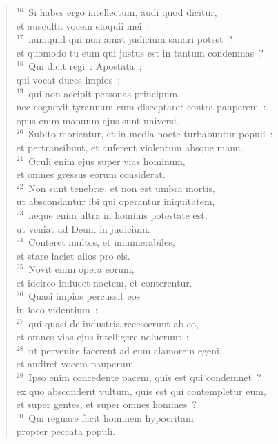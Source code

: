 \begin{flushleft}
\begin{verse}
${}^{16}$~Si habes ergo intellectum, audi quod dicitur,\\ et ausculta vocem eloquii mei~:\\
${}^{17}$~numquid qui non amat judicium sanari potest~?\\ et quomodo tu eum qui justus est in tantum condemnas~?\\
${}^{18}$~Qui dicit regi~: Apostata~;\\ qui vocat duces impios~;\\
${}^{19}$~qui non accipit personas principum,\\ nec cognovit tyrannum cum disceptaret contra pauperem~:\\ opus enim manuum ejus sunt universi.\\
${}^{20}$~Subito morientur, et in media nocte turbabuntur populi~:\\ et pertransibunt, et auferent violentum absque manu.\\
${}^{21}$~Oculi enim ejus super vias hominum,\\ et omnes gressus eorum considerat.\\
${}^{22}$~Non sunt tenebr\ae , et non est umbra mortis,\\ ut abscondantur ibi qui operantur iniquitatem,\\
${}^{23}$~neque enim ultra in hominis potestate est,\\ ut veniat ad Deum in judicium.\\
${}^{24}$~Conteret multos, et innumerabiles,\\ et stare faciet alios pro eis.\\
${}^{25}$~Novit enim opera eorum,\\ et idcirco inducet noctem, et conterentur.\\
${}^{26}$~Quasi impios percussit eos\\ in loco videntium~:\\
${}^{27}$~qui quasi de industria recesserunt ab eo,\\ et omnes vias ejus intelligere noluerunt~:\\
${}^{28}$~ut pervenire facerent ad eum clamorem egeni,\\ et audiret vocem pauperum.\\
${}^{29}$~Ipso enim concedente pacem, quis est qui condemnet~?\\ ex quo absconderit vultum, quis est qui contempletur eum,\\ et super gentes, et super omnes homines~?\\
${}^{30}$~Qui regnare facit hominem hypocritam\\ propter peccata populi.\\

\end{verse}
\end{flushleft}
